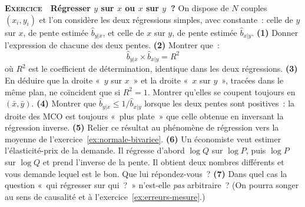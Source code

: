 \documentclass[10pt,a4paper,notitlepage]{article}
\newcounter{xnumber}
\newcommand{\exercice}{\refstepcounter{xnumber}\textsc{\textbf{Exercice}} \textbf{\thexnumber}\,\,}
\newcommand{\question}[1]{\textbf{(#1)}}
\begin{document}
\bigskip

\exercice\label{ex:regression-inverse} \textbf{Régresser $y$ sur $x$ ou $x$ sur
$y$~?} On dispose de $N$ couples $(x_i,y_i)$ et l'on considère les deux
régressions simples, avec constante~: celle de $y$ sur $x$, de pente estimée
$\hat b_{y|x}$, et celle de $x$ sur $y$, de pente estimée $\hat b_{x|y}$.
\question{1} Donner l'expression de chacune des deux pentes. \question{2}
Montrer que~:
\[
  \hat b_{y|x}\times\hat b_{x|y} = R^2
\]
où $R^2$ est le coefficient de détermination, identique dans les deux
régressions. \question{3} En déduire que la droite «~$y$ sur $x$~» et la droite
«~$x$ sur $y$~», tracées dans le même plan, ne coïncident que si $R^2=1$.
Montrer qu'elles se coupent toujours en $(\bar x,\bar y)$. \question{4} Montrer
que $\hat b_{y|x} \leq 1/\hat b_{x|y}$ lorsque les deux pentes sont positives~:
la droite des MCO est toujours «~plus plate~» que celle obtenue en inversant la
régression inverse. \question{5} Relier ce résultat au phénomène de régression
vers la moyenne de l'exercice~\ref{ex:normale-bivariee}. \question{6} Un
économiste veut estimer l'élasticité-prix de la demande. Il régresse d'abord
$\log Q$ sur $\log P$, puis $\log P$ sur $\log Q$ et prend l'inverse de la
pente. Il obtient deux nombres différents et vous demande lequel est le bon. Que
lui répondez-vous~? \question{7} Dans quel cas la question «~qui régresser sur
qui~?~» n'est-elle \emph{pas} arbitraire~? (On pourra songer au sens de
causalité et à l'exercice~\ref{ex:erreurs-mesure}.)\newline

\bigskip
\end{document}
